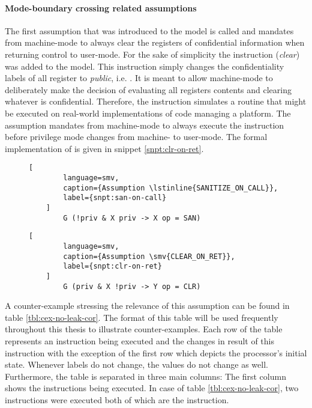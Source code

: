 \paragraph{Mode-boundary crossing related assumptions}
The first assumption that was introduced to the model is called  and mandates from machine-mode to always clear the registers of confidential information when returning control to user-mode.
For the sake of simplicity the instruction  (\textit{clear}) was added to the model.
This instruction simply changes the confidentiality labels of all register to \textit{public}, i.e. .
It is meant to allow machine-mode to deliberately make the decision of evaluating all registers contents and clearing whatever is confidential.
Therefore, the  instruction simulates a routine that might be executed on real-world implementations of code managing a platform.
The  assumption mandates from machine-mode to always execute the  instruction before privilege mode changes from machine- to user-mode.
The formal implementation of  is given in snippet \ref{snpt:clr-on-ret}.

\begin{figure}
    \begin{lstlisting}[
        language=smv,
        caption={Assumption \lstinline{SANITIZE_ON_CALL}},
        label={snpt:san-on-call}
    ]
        G (!priv & X priv -> X op = SAN)
    \end{lstlisting}

    \begin{lstlisting}[
        language=smv,
        caption={Assumption \smv{CLEAR_ON_RET}},
        label={snpt:clr-on-ret}
    ]
        G (priv & X !priv -> Y op = CLR)
    \end{lstlisting}
\end{figure}

A counter-example stressing the relevance of this assumption can be found in table \ref{tbl:cex-no-leak-cor}.
The format of this table will be used frequently throughout this thesis to illustrate counter-examples.
Each row of the table represents an instruction being executed and the changes in result of this instruction with the exception of the first row which depicts the processor's initial state.
Whenever labels do not change, the values do not change as well.
Furthermore, the table is separated in three main columns: The first column shows the instructions being executed.
In case of table \ref{tbl:cex-no-leak-cor}, two instructions were executed both of which are the  instruction.

